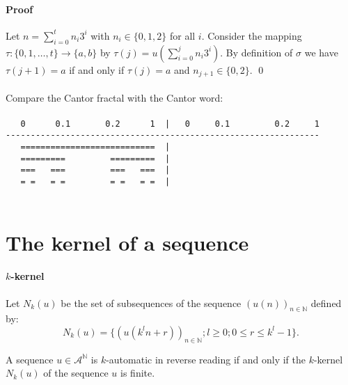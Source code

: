 \documentclass{article}
\begin{document}
\paragraph{Proof} Let $n = \sum_{i = 0}^t n_i 3^i$ with $n_i \in \{0, 1, 2\}$
for all $i$. Consider the mapping 
$\tau: \{0, 1, \ldots, t\} \rightarrow \{a, b\}$
by $\tau(j) = u(\sum_{i = 0}^j n_i 3^i)$. By definition of $\sigma$ we have 
$\tau(j + 1) = a$ if and only if $\tau(j) = a$ and $n_{j + 1} \in \{0, 2\}$.
\qed\\
\\
Compare the Cantor fractal with the Cantor word:\\
\\
\verb#   0      0.1       0.2      1  |   0     0.1         0.2     1#\\
\verb#---------------------------------------------------------------#\\
\verb#   ===========================  |               #\\
\verb#   =========         =========  |      # { } { } { } { } { } { } { } { } { } { } { } { }\\
\verb#   ===   ===         ===   ===  |   #\\
\verb#   = =   = =         = =   = =  |  #\\
\\

\section*{The kernel of a sequence}
\paragraph{$k$-kernel} Let $N_k(u)$ be the set of subsequences of the sequence
$(u(n))_{n \in \mathbb{N}}$ defined by:
\begin{displaymath}
N_k(u) = \{(u(k^ln + r))_{n \in \mathbb{N}}; l \ge 0; 0 \le r \le k^l - 1\}.
\end{displaymath}

\begin{automata}
A sequence $u \in \mathcal{A}^\mathbb{N}$ is $k$-automatic in reverse reading 
if and only if the $k$-kernel $N_k(u)$ of the sequence $u$ is finite.
\end{automata}
\end{document}
